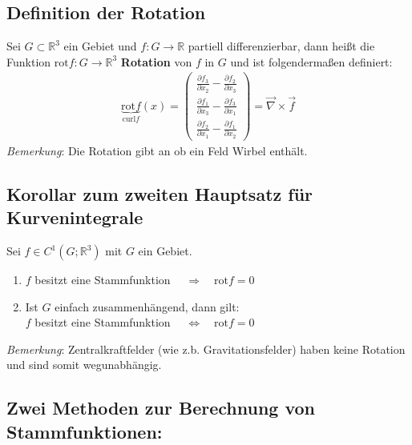 \documentclass[11pt,a4paper]{book}
\newcommand {\R}	{\mathbb{R}}
\newcommand{\1}    	{\mathbbm{1}}
\newcommand{\Bemerkung}	{\noindent\textit{Bemerkung}: }
\begin{document}
\subsection{Definition der Rotation}
Sei \(G \subset \R^3\) ein Gebiet und \(f: G \rightarrow \R\) partiell differenzierbar, dann heißt die Funktion \(\textrm{rot} f : G \rightarrow \R^3 \) \textbf{Rotation} von \(f\) in \(G\) und ist folgendermaßen definiert: 
\begin{align*}
	\underbrace{\textrm{rot} f}_{\textrm{curl} f}(x) = 
	\left( \begin{array}{c}
		\frac{\partial f_3}{\partial x_2} - \frac{\partial f_2}{\partial x_3} \\
		\frac{\partial f_1}{\partial x_3} - \frac{\partial f_3}{\partial x_1} \\
		\frac{\partial f_2}{\partial x_1} - \frac{\partial f_1}{\partial x_2}
	\end{array} \right) = \vec{\nabla} \times \vec{f}
\end{align*}
\Bemerkung Die Rotation gibt an ob ein Feld Wirbel enthält.

\subsection{Korollar zum zweiten Hauptsatz für Kurvenintegrale}
Sei \(f \in C^1(G;\R^3)\) mit \(G\) ein Gebiet.
\begin{enumerate}
	\item \(f\) besitzt eine Stammfunktion \(\quad\Rightarrow\quad \textrm{rot} f = 0\) 
	\item Ist \(G\) einfach zusammenhängend, dann gilt:\\
	\(f\) besitzt eine Stammfunktion \(\quad\Leftrightarrow\quad \textrm{rot} f = 0\)
\end{enumerate}


\Bemerkung Zentralkraftfelder (wie z.b. Gravitationsfelder) haben keine Rotation und sind somit wegunabhängig.

\subsection*{Zwei Methoden zur Berechnung von Stammfunktionen:}
\end{document}
